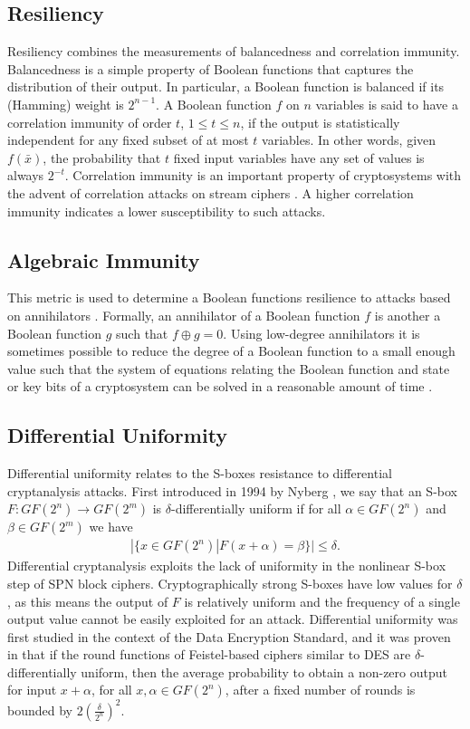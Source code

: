 \subsection{Resiliency}
Resiliency combines the measurements of balancedness and correlation immunity. 
Balancedness is a simple property of Boolean functions that captures the distribution of their output.
In particular, a Boolean function is balanced if its (Hamming) weight is $2^{n - 1}$. 
A Boolean function $f$ on $n$ variables is said to have a correlation immunity 
of order $t$, $1 \leq t \leq n$, if the output is statistically independent for any fixed subset of at most $t$ 
variables. In other words, given $f(\bar{x})$, the probability that $t$ fixed input variables have 
any set of values is always $2^{-t}$. Correlation immunity is an important property of 
cryptosystems with the advent of correlation attacks on stream ciphers \cite{Canteaut05-1}.
A higher correlation immunity indicates a lower susceptibility to such attacks.

\subsection{Algebraic Immunity}
This metric is used to determine a Boolean functions resilience to attacks
based on annihilators \cite{Cusik09-1}. Formally, an annihilator of a Boolean 
function $f$ is another a Boolean function $g$ such that $f \oplus g = 0$. 
Using low-degree annihilators it is sometimes possible to reduce the degree
of a Boolean function to a small enough value such that the system of 
equations relating the Boolean function and state or key bits of a cryptosystem
can be solved in a reasonable amount of time \cite{Frederik04-1}. 

\subsection{Differential Uniformity}
Differential uniformity relates to the S-boxes resistance to differential cryptanalysis
attacks. First introduced in 1994 by Nyberg \cite{Nyberg94-1}, we say that
an S-box $F : GF(2^n) \to GF(2^m)$ is $\delta$-differentially uniform if for all $\alpha \in GF(2^n)$
and $\beta \in GF(2^m)$ we have
\begin{align*}
|\{x \in GF(2^n) | F(x + \alpha) = \beta\}| \leq \delta.
\end{align*}
Differential cryptanalysis exploits the lack of uniformity in the nonlinear S-box
step of SPN block ciphers. Cryptographically strong S-boxes have low values for
$\delta$, as this means the output of $F$ is relatively uniform and the frequency of a 
single output value cannot be easily exploited for an attack. 
Differential uniformity was first studied in the context of the Data Encryption
Standard, and it was proven in \cite{Nyberg94-1} that if the round functions of
Feistel-based ciphers similar to DES are $\delta$-differentially uniform, then 
the average probability to obtain a non-zero output for input $x + \alpha$, for
all $x, \alpha \in GF(2^n)$, after a fixed number of rounds is bounded by $2(\frac{\delta}{2^n})^2$.

